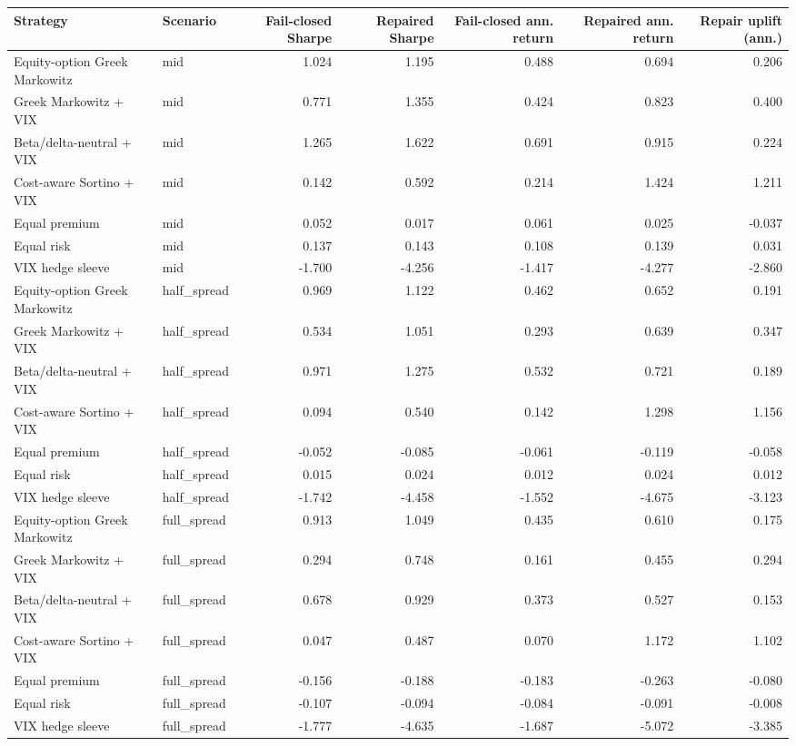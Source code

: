 \begin{tabular}{llrrrrr}
\toprule
Strategy & Scenario & Fail-closed Sharpe & Repaired Sharpe & Fail-closed ann. return & Repaired ann. return & Repair uplift (ann.) \\
\midrule
Equity-option Greek Markowitz & mid & 1.024 & 1.195 & 0.488 & 0.694 & 0.206 \\
Greek Markowitz + VIX & mid & 0.771 & 1.355 & 0.424 & 0.823 & 0.400 \\
Beta/delta-neutral + VIX & mid & 1.265 & 1.622 & 0.691 & 0.915 & 0.224 \\
Cost-aware Sortino + VIX & mid & 0.142 & 0.592 & 0.214 & 1.424 & 1.211 \\
Equal premium & mid & 0.052 & 0.017 & 0.061 & 0.025 & -0.037 \\
Equal risk & mid & 0.137 & 0.143 & 0.108 & 0.139 & 0.031 \\
VIX hedge sleeve & mid & -1.700 & -4.256 & -1.417 & -4.277 & -2.860 \\
Equity-option Greek Markowitz & half\_spread & 0.969 & 1.122 & 0.462 & 0.652 & 0.191 \\
Greek Markowitz + VIX & half\_spread & 0.534 & 1.051 & 0.293 & 0.639 & 0.347 \\
Beta/delta-neutral + VIX & half\_spread & 0.971 & 1.275 & 0.532 & 0.721 & 0.189 \\
Cost-aware Sortino + VIX & half\_spread & 0.094 & 0.540 & 0.142 & 1.298 & 1.156 \\
Equal premium & half\_spread & -0.052 & -0.085 & -0.061 & -0.119 & -0.058 \\
Equal risk & half\_spread & 0.015 & 0.024 & 0.012 & 0.024 & 0.012 \\
VIX hedge sleeve & half\_spread & -1.742 & -4.458 & -1.552 & -4.675 & -3.123 \\
Equity-option Greek Markowitz & full\_spread & 0.913 & 1.049 & 0.435 & 0.610 & 0.175 \\
Greek Markowitz + VIX & full\_spread & 0.294 & 0.748 & 0.161 & 0.455 & 0.294 \\
Beta/delta-neutral + VIX & full\_spread & 0.678 & 0.929 & 0.373 & 0.527 & 0.153 \\
Cost-aware Sortino + VIX & full\_spread & 0.047 & 0.487 & 0.070 & 1.172 & 1.102 \\
Equal premium & full\_spread & -0.156 & -0.188 & -0.183 & -0.263 & -0.080 \\
Equal risk & full\_spread & -0.107 & -0.094 & -0.084 & -0.091 & -0.008 \\
VIX hedge sleeve & full\_spread & -1.777 & -4.635 & -1.687 & -5.072 & -3.385 \\
\bottomrule
\end{tabular}
